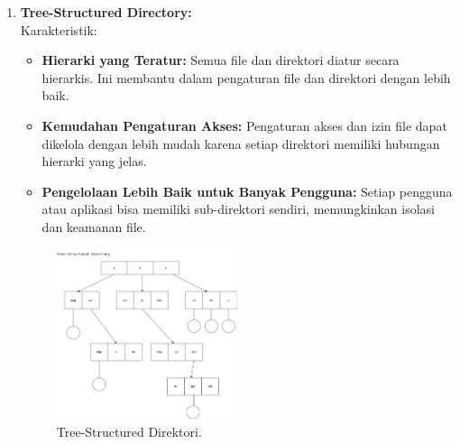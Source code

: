 \documentclass[12pt]{article}
\begin{document}
\begin{itemize}
\begin{enumerate}
\begin{enumerate}[label=\alph*.]
        \item \textbf{Tree-Structured Directory:} \\
        Karakteristik:
        \begin{itemize}
            \item \textbf{Hierarki yang Teratur:} Semua file dan direktori diatur secara hierarkis. Ini membantu dalam pengaturan file dan direktori dengan lebih baik.
            \item \textbf{Kemudahan Pengaturan Akses:} Pengaturan akses dan izin file dapat dikelola dengan lebih mudah karena setiap direktori memiliki hubungan hierarki yang jelas.
            \item \textbf{Pengelolaan Lebih Baik untuk Banyak Pengguna:} Setiap pengguna atau aplikasi bisa memiliki sub-direktori sendiri, memungkinkan isolasi dan keamanan file.
        \end{itemize}

        \begin{figure}[h]
        \centering
        \includegraphics[width=0.5\textwidth]{assets/gambar3.jpg}
        \caption{Tree-Structured Direktori.}
        \label{fig:tree-structured-direktori}
        \end{figure}


\end{enumerate}
\end{enumerate}
\end{itemize}
\end{document}

